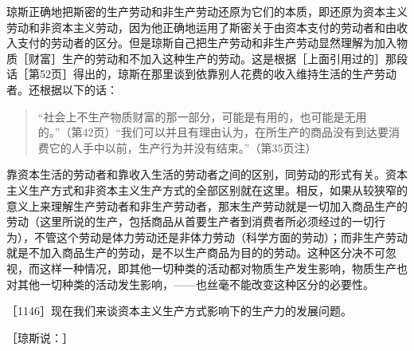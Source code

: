 琼斯正确地把斯密的生产劳动和非生产劳动还原为它们的本质，即还原为资本主义劳动和非资本主义劳动，因为他正确地运用了斯密关于由资本支付的劳动者和由收入支付的劳动者的区分。但是琼斯自己把生产劳动和非生产劳动显然理解为加入物质［财富］生产的劳动和不加入这种生产的劳动。这是根据［上面引用过的］那段话［第52页］得出的，琼斯在那里谈到依靠别人花费的收入维持生活的生产劳动者。还根据以下的话：

\begin{quote}{“社会上不生产物质财富的那一部分，可能是有用的，也可能是无用的。”（第42页）“我们可以并且有理由认为，在所生产的商品没有到达要消费它的人手中以前，生产行为并没有结束。”（第35页注）}\end{quote}

靠资本生活的劳动者和靠收入生活的劳动者之间的区别，同劳动的形式有关。资本主义生产方式和非资本主义生产方式的全部区别就在这里。相反，如果从较狭窄的意义上来理解生产劳动者和非生产劳动者，那末生产劳动就是一切加入商品生产的劳动（这里所说的生产，包括商品从首要生产者到消费者所必须经过的一切行为），不管这个劳动是体力劳动还是非体力劳动（科学方面的劳动）；而非生产劳动就是不加入商品生产的劳动，是不以生产商品为目的的劳动。这种区分决不可忽视，而这样一种情况，即其他一切种类的活动都对物质生产发生影响，物质生产也对其他一切种类的活动发生影响，——也丝毫不能改变这种区分的必要性。


［1146］现在我们来谈资本主义生产方式影响下的生产力的发展问题。

［琼斯说：］


